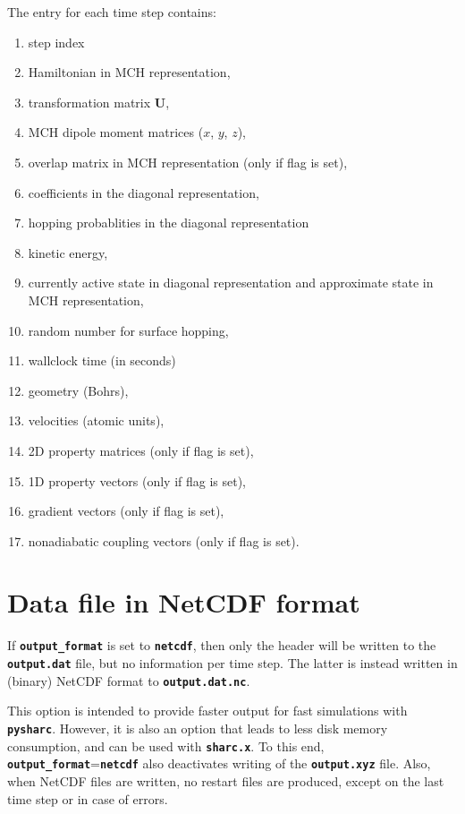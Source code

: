 \documentclass[a4paper,10pt,DIV=15,openany]{scrbook}
\newcommand{\ttt}[1]{\textbf{\texttt{#1}}}
\newcommand{\VEC}[1]{\ensuremath{\mathbf{#1}}}
\begin{document}
The entry for each time step contains:
\begin{enumerate}
  \item step index
  \item Hamiltonian in MCH representation,
  \item transformation matrix $\VEC{U}$,
  \item MCH dipole moment matrices ($x$, $y$, $z$),
  \item overlap matrix in MCH representation (only if flag is set),
  \item coefficients in the diagonal representation,
  \item hopping probablities in the diagonal representation
  \item kinetic energy,
  \item currently active state in diagonal representation and approximate state in MCH representation,
  \item random number for surface hopping,
  \item wallclock time (in seconds)
  \item geometry (Bohrs),
  \item velocities (atomic units),
  \item 2D property matrices (only if flag is set),
  \item 1D property vectors (only if flag is set),
  \item gradient vectors (only if flag is set),
  \item nonadiabatic coupling vectors (only if flag is set).
\end{enumerate}

\section{Data file in NetCDF format}\label{sec:netcdf}

If \ttt{output\_format} is set to \ttt{netcdf}, then only the header will be written to the \ttt{output.dat} file, but no information per time step.
The latter is instead written in (binary) NetCDF format to \ttt{output.dat.nc}.

This option is intended to provide faster output for fast simulations with \ttt{pysharc}.
However, it is also an option that leads to less disk memory consumption, and can be used with \ttt{sharc.x}.
To this end, \ttt{output\_format}=\ttt{netcdf} also deactivates writing of the \ttt{output.xyz} file.
Also, when NetCDF files are written, no restart files are produced, except on the last time step or in case of errors.
\end{document}
